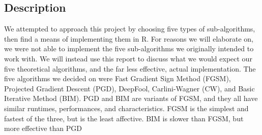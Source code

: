 \documentclass[11pt]{article}
\newcommand{\maincontent}{
\clearpage
\phantom{}
}
\begin{document}
\subsection{Description}
 \par{}\par
 We attempted to approach this project by choosing five types of sub-algorithms, then find a means of implementing them in R. For reasons we will elaborate on, we were not able to implement the five sub-algorithms we originally intended to work with. We will instead use this report to discuss what we would expect our five theoretical algorithms, and the far less effective, actual implementation. The five algorithms we decided on were Fast Gradient Sign Method (FGSM), Projected Gradient Descent (PGD), DeepFool, Carlini-Wagner (CW), and Basic Iterative Method (BIM). PGD and BIM are variants of FGSM, and they all have similar runtimes, performances, and characteristics. FGSM is the simplest and fastest of the three, but is the least affective. BIM is slower than FGSM, but more effective than PGD
 \par{}\par

    \par{}\par
    \par{}\par
    \par{}\par


\maincontent
\section{}
\subsection{}
\url{}
\subsection{}
    \par{}\par

\maincontent
\section{}
\subsection{}
\par{ }\par
\end{document}
